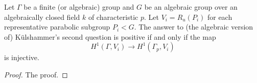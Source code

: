 \begin{lemma}\label{kToHOne} Let $\Gamma$ be a finite (or algebraic) group and $G$ be an algebraic group over an algebraically closed field $k$ of characteristic $p$. Let $V_i = R_u(P_i)$ for each representative parabolic subgroup $P_i<G$. The answer to (the algebraic version of) K\"ulshammer's second question is positive if and only if the map
	\begin{displaymath}
		H^1(\Gamma, V_i) \rightarrow H^1(\Gamma_p, V_i)
	\end{displaymath}
	is injective.
\end{lemma}
\begin{proof}
	The proof.
\end{proof}

% 
% 
% 
% 
% 
